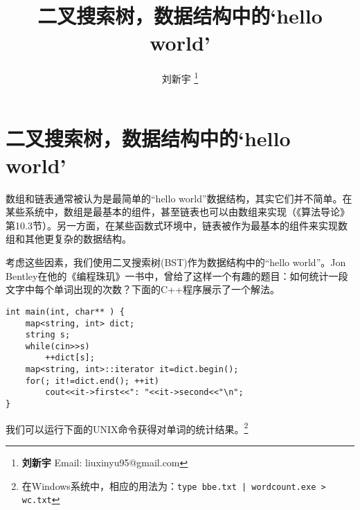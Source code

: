 \documentclass{ctexart}
\begin{document}


\title{二叉搜索树，数据结构中的`hello world'}

\author{刘新宇
\thanks{{\bfseries 刘新宇} \newline
  Email: liuxinyu95@gmail.com \newline}
  }

\maketitle
\fi


\ifx\wholebook\relax
\chapter{二叉搜索树，数据结构中的`hello world'}
\fi


数组和链表通常被认为是最简单的“hello world”数据结构，其实它们并不简单。在某些系统中，数组是最基本的组件，甚至链表也可以由数组来实现（《算法导论》第10.3节\cite{CLRS}）。另一方面，在某些函数式环境中，链表被作为最基本的组件来实现数组和其他更复杂的数据结构。

考虑这些因素，我们使用二叉搜索树(BST)作为数据结构中的“hello world”。Jon Bentley在他的《编程珠玑》一书中，曾给了这样一个有趣的题目\cite{Bentley}：如何统计一段文字中每个单词出现的次数？下面的C++程序展示了一个解法。

\lstset{language=C++}
\begin{lstlisting}
int main(int, char** ) {
    map<string, int> dict;
    string s;
    while(cin>>s)
        ++dict[s];
    map<string, int>::iterator it=dict.begin();
    for(; it!=dict.end(); ++it)
        cout<<it->first<<": "<<it->second<<"\n";
}
\end{lstlisting}

我们可以运行下面的UNIX命令获得对单词的统计结果。\footnote{在Windows系统中，相应的用法为：\texttt{type bbe.txt | wordcount.exe > wc.txt}}
\end{document}
